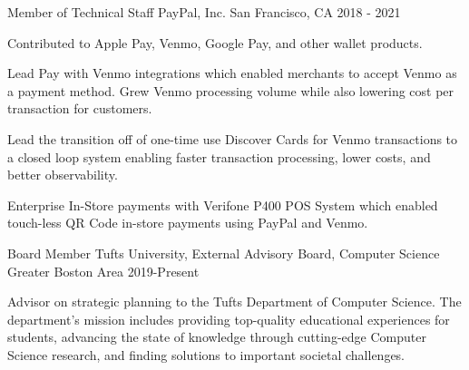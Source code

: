 
\begin{cventries}

  \cventry
    {Member of Technical Staff} %
    {PayPal, Inc.} %
    {San Francisco, CA} %
    {2018 - 2021} %
    {
      \begin{cvitems} %
        \item {Contributed to Apple Pay, Venmo, Google Pay, and other wallet products.}
        \item {Lead Pay with Venmo integrations which enabled merchants to accept Venmo as a payment method. Grew Venmo processing volume while also lowering cost per transaction for customers.}
        \item {Lead the transition off of one-time use Discover Cards for Venmo transactions to a closed loop system enabling faster transaction processing, lower costs, and better observability.}
        \item {Enterprise In-Store payments with Verifone P400 POS System which enabled touch-less QR Code in-store payments using PayPal and Venmo.}
      \end{cvitems}
    }

  \cventry
    {Board Member} %
    {Tufts University, External Advisory Board, Computer Science} %
    {Greater Boston Area} %
    {2019-Present} %
    {
      \begin{cvitems} %
      \item {Advisor on strategic planning to the Tufts Department of Computer Science. The department's mission includes providing top-quality educational experiences for students, advancing the state of knowledge through cutting-edge Computer Science research, and finding solutions to important societal challenges.}
      \end{cvitems}
    }


\end{cventries}
